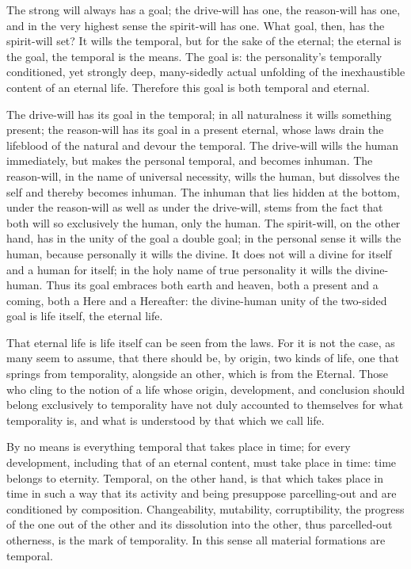 \documentclass[12pt,a4paper,openany]{book}
\newcommand{\opage}[1]{\marginnote{\footnotesize\textit{[#1]}}}
\begin{document}
The strong will always has a goal; the drive-will has one,
the reason-will has one, and in the very highest sense the
spirit-will has one. What goal, then, has the spirit-will set?
It wills the temporal, but for the sake of the eternal; the eternal
is the goal, the temporal is the means. The goal is: the personality's
temporally conditioned, yet strongly deep, many-sidedly actual
unfolding of the inexhaustible content of an eternal life.
Therefore this goal is both temporal and eternal.

The drive-will has its goal in the temporal; in all
naturalness it wills something present; the reason-will has its goal in
a present eternal, whose laws drain the lifeblood of the natural and
devour the temporal. The drive-will wills the human immediately,
but makes the personal temporal, and becomes
inhuman. The reason-will, in the name of universal necessity,
wills the human, but dissolves the self and thereby
becomes inhuman. The inhuman that lies hidden
at the bottom, under the reason-will as well as under the drive-will,
stems from the fact that both will so exclusively the
human, only the human. The spirit-will, on the other hand,
has in the unity of the goal a double goal; in the personal
sense it wills the human, because personally it wills the
divine. It does not will a divine for itself and
a human for itself; in the holy name of true personality
it wills the divine-human. Thus its
goal embraces both earth and heaven, both a present and a
coming, both a Here and a Hereafter: the divine-human unity
of the two-sided goal is life itself, the
eternal life.

That eternal life is life itself can be seen from the laws.
For it is not the case, as many seem
to assume, that there should be, by origin, two kinds of
life, one that springs from temporality, alongside an
\setcounter{footnote}{0}%
\opage{67}other, which is from the Eternal. Those who cling to
the notion of a life whose origin, development, and
conclusion should belong exclusively to temporality have
not duly accounted to themselves for what temporality is, and
what is understood by that which we call life.

By no means is everything temporal that takes place in time;
for every development, including that of an eternal content, must take place
in time: time belongs to eternity. Temporal, on the other hand,
is that which takes place in time in such a way that its
activity and being presuppose parcelling-out and are conditioned by
composition. Changeability, mutability, corruptibility,
the progress of the one out of the other and its dissolution
into the other, thus parcelled-out otherness, is the mark
of temporality. In this sense all material
formations are temporal.
\end{document}
